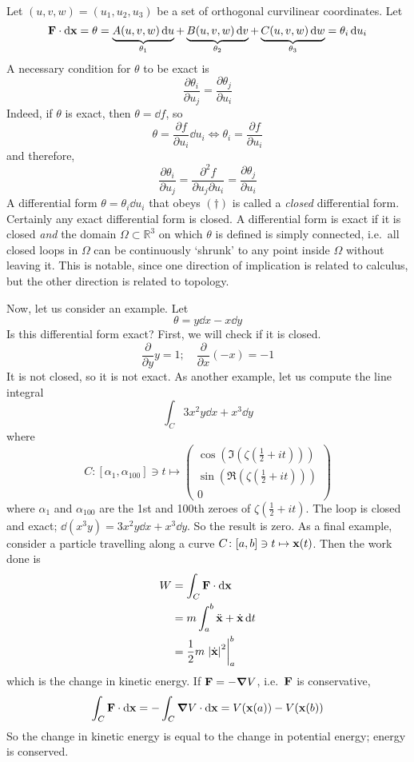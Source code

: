 Let \((u, v, w) = (u_1, u_2, u_3)\) be a set of orthogonal curvilinear coordinates.
Let
\[
	\vb F \cdot \dd \vb x = \theta = \underbrace{A(u, v, w) \dd{u}}_{\theta_1} + \underbrace{B(u, v, w) \dd{v}}_{\theta_2} + \underbrace{C(u, v, w) \dd{w}}_{\theta_3} = \theta_i \dd{u}_i
\]
A necessary condition for \(\theta\) to be exact is
\begin{equation}
	\frac{\partial \theta_i}{\partial u_j} = \frac{\partial \theta_j}{\partial u_i}
	\tag{\(\dagger\)}
\end{equation}
Indeed, if \(\theta\) is exact, then \(\theta = \dd{f}\), so
\[
	\theta = \frac{\partial f}{\partial u_i} \dd{u}_i \iff \theta_i = \frac{\partial f}{\partial u_i}
\]
and therefore,
\[
	\frac{\partial \theta_i}{\partial u_j} = \frac{\partial^2 f}{\partial u_j \partial u_i} = \frac{\partial \theta_j}{\partial u_i}
\]
A differential form \(\theta = \theta_i \dd{u}_i\) that obeys \((\dagger)\) is called a \textit{closed} differential form.
Certainly any exact differential form is closed.
A differential form is exact if it is closed \textit{and} the domain \(\Omega \subset \mathbb R^3\) on which \(\theta\) is defined is simply connected, i.e.\ all closed loops in \(\Omega\) can be continuously `shrunk' to any point inside \(\Omega\) without leaving it.
This is notable, since one direction of implication is related to calculus, but the other direction is related to topology.

Now, let us consider an example.
Let
\[
	\theta = y \dd{x} - x \dd{y}
\]
Is this differential form exact? First, we will check if it is closed.
\[
	\frac{\partial}{\partial y} y = 1;\quad \frac{\partial}{\partial x} (-x) = -1
\]
It is not closed, so it is not exact.
As another example, let us compute the line integral
\[
	\int_C 3x^2y\dd{x} + x^3\dd{y}
\]
where
\[
	C \colon [\alpha_1, \alpha_{100}] \ni t \mapsto \begin{pmatrix}
		\cos \left( \Im \left( \zeta \left( \frac{1}{2} + it \right) \right) \right) \\
		\sin \left( \Re \left( \zeta \left( \frac{1}{2} + it \right) \right) \right) \\
		0
	\end{pmatrix}
\]
where \(\alpha_1\) and \(\alpha_{100}\) are the 1st and 100th zeroes of \(\zeta \left( \frac{1}{2} + it \right)\).
The loop is closed and exact; \(\dd(x^3 y) = 3x^2 y \dd{x} + x^3 \dd{y}\).
So the result is zero.
As a final example, consider a particle travelling along a curve \(C \colon [a, b] \ni t \mapsto \vb x(t)\).
Then the work done is
\begin{align*}
	W & = \int_C \vb F \cdot \dd \vb x                    \\
	  & = m \int_a^b \ddot{\vb x} + \dot{\vb x} \dd{t} \\
	  & = \frac{1}{2}m \eval{\abs{\dot{\vb x}}^2}_a^b
\end{align*}
which is the change in kinetic energy.
If \(\vb F = -\grad V\), i.e.\ \(\vb F\) is conservative,
\[
	\int_C \vb F \cdot \dd \vb x = -\int_C \grad V \cdot \dd \vb x = V(\vb x(a)) - V(\vb x(b))
\]
So the change in kinetic energy is equal to the change in potential energy; energy is conserved.
